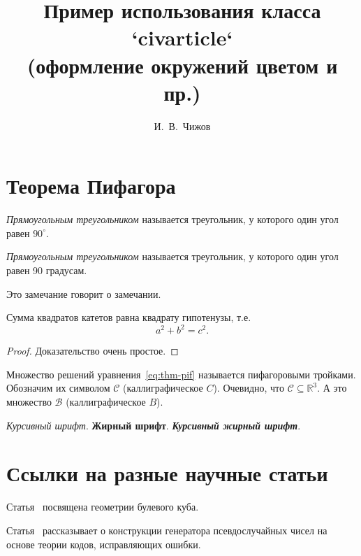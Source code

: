 \documentclass{../civarticle}
\title{
    Пример использования класса `civarticle`\\
    \small{(оформление окружений цветом и пр.)}
}
\author{И.~В.~Чижов}
\begin{document}
\section{Теорема Пифагора}
\label{sec:thm-pif}

\begin{definition}
  \label{def:example.tex<latex-article-cls/example>:triange}
  \emph{Прямоугольным треугольником} называется треугольник, у
  которого один угол равен \(90^{\circ}\).
\end{definition}


\begin{definition}
  \label{def:triangle}
  \emph{Прямоугольным треугольником} называется треугольник, у
  которого один угол равен 90 градусам.
\end{definition}

\begin{remark}
  \label{rem:example.tex<latex-article-cls/example>:1}
Это замечание говорит о замечании.
\blindtext%
\end{remark}


\begin{theorem}
  Сумма квадратов катетов равна квадрату гипотенузы, т.е.
  \begin{equation}
    \label{eq:thm-pif}
    a^2+b^2=c^2.
  \end{equation}
\end{theorem}
\begin{proof}
  Доказательство очень простое.
\end{proof}
Множество решений уравнения~\eqref{eq:thm-pif} называется пифагоровыми
тройками.  Обозначим их символом $\mathcal{C}$ (каллиграфическое $C$).
Очевидно, что $\mathcal{C}\subseteq \mathbb{R}^{3}$.  А это множество
$\mathcal{B}$ (каллиграфическое $B$).

\textit{Курсивный шрифт}.  \textbf{Жирный шрифт}.
\textit{\textbf{Курсивный жирный шрифт}}.

\blindmathtrue \Blindtext[11][1]


\section{Ссылки на разные научные статьи}
\label{sec:ref-to-articles}

Статья~\cite{ahlswede1977} посвящена геометрии булевого куба.

Статья~\cite{ahmed2013} рассказывает о конструкции генератора
псевдослучайных чисел на основе теории кодов, исправляющих ошибки.
\end{document}
